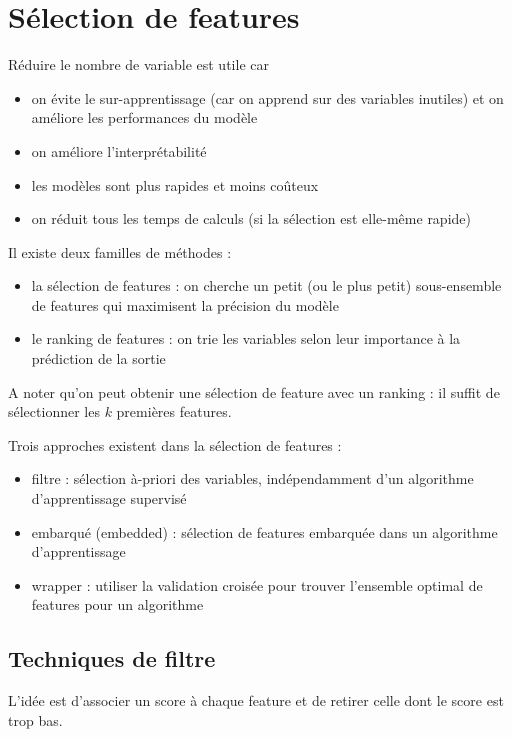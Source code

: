 \chapter{Sélection de features}

Réduire le nombre de variable est utile car

\begin{itemize}
	\item on évite le sur-apprentissage (car on apprend sur des variables inutiles) et on améliore les performances du modèle
	\item on améliore l'interprétabilité
	\item les modèles sont plus rapides et moins coûteux
	\item on réduit tous les temps de calculs (si la sélection est elle-même rapide)
\end{itemize}

Il existe deux familles de méthodes :

\begin{itemize}
	\item la sélection de features : on cherche un petit (ou le plus petit) sous-ensemble de features qui maximisent la précision du modèle
	\item le ranking de features : on trie les variables selon leur importance à la prédiction de la sortie
\end{itemize}

A noter qu'on peut obtenir une sélection de feature avec un ranking : il suffit de sélectionner les $k$ premières features.

Trois approches existent dans la sélection de features :

\begin{itemize}
	\item filtre : sélection à-priori des variables, indépendamment d'un algorithme d'apprentissage supervisé
	\item embarqué (embedded) : sélection de features embarquée dans un algorithme d'apprentissage
	\item wrapper : utiliser la validation croisée pour trouver l'ensemble optimal de features pour un algorithme
\end{itemize}

\section{Techniques de filtre}

	L'idée est d'associer un score à chaque feature et de retirer celle dont le score est trop bas.
	
